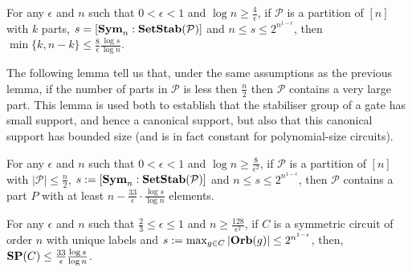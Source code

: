 \documentclass[../paper.tex]{subfiles}
\begin{document}
\begin{lem}
  \label{lem:big-or-small}
  For any $\epsilon$ and $n$ such that $0 < \epsilon < 1$ and $\log n \geq
  \frac{4}{\epsilon}$, if $\mathcal{P}$ is a partition of $[n]$ with $k$ parts,
  $s = [\text{\textbf{Sym}}_n : \text{\textbf{SetStab}} (\mathcal{P})]$ and $n \leq s \leq
  2^{n^{1-\epsilon}}$, then $\min \{k, n-k\} \leq \frac{8}{\epsilon} \frac{\log
    s}{\log n}$.
\end{lem}

The following lemma tell us that, under the same assumptions as the previous
lemma, if the number of parts in $\mathcal{P}$ is less then $\frac{n}{2}$ then
$\mathcal{P}$ contains a very large part. This lemma is used both to establish
that the stabiliser group of a gate has small support, and hence a canonical
support, but also that this canonical support has bounded size (and is in fact
constant for polynomial-size circuits).

\begin{lem}
  \label{lem:small-means-support}
  For any $\epsilon$ and $n$ such that $0 < \epsilon < 1$ and $\log n \geq
  \frac{8}{\epsilon^2}$, if $\mathcal{P}$ is a partition of $[n]$ with $\vert
  \mathcal{P} \vert \leq \frac{n}{2}$, $s:= [\text{\textbf{Sym}}_n : \text{\textbf{SetStab}} (\mathcal{P})]$
  and $n \leq s \leq 2^{n^{1-\epsilon}}$, then $\mathcal{P}$ contains a part $P$
  with at least $n - \frac{33}{\epsilon} \cdot \frac{\log s} {\log n}$ elements.
\end{lem}


\begin{thm}
  \label{thm:support-thm}
  For any $\epsilon$ and $n$ such that $\frac{2}{3} \leq \epsilon \leq 1$ and $n
  \geq \frac{128}{\epsilon^2}$, if $C$ is a symmetric circuit of order $n$ with
  unique labels and $s := \max_{g \in C} \vert \text{\textbf{Orb}} (g)\vert \leq
  2^{n^{1-\epsilon}}$, then, $\text{\textbf{SP}}(C) \leq \frac{33}{\epsilon}\frac{\log s}{\log
    n}$.
\end{thm}
\end{document}
